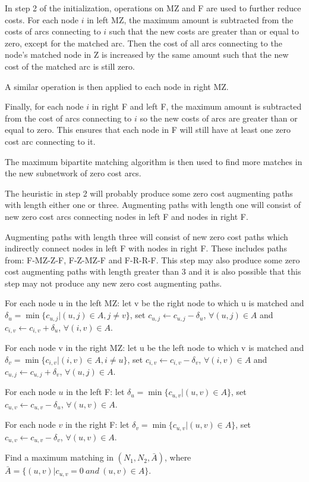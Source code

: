 In step 2 of the initialization,
operations on MZ and F are used to further reduce costs.
For each node $i$ in left MZ, the maximum amount is subtracted from
the costs of arcs connecting to $i$ such that the new costs are greater than
or equal to zero, except for the matched arc.  Then the cost of all
arcs connecting to the node's matched node in Z is increased by the
same amount such that the new cost of the matched arc is still zero.

A similar operation is then applied to each node in right MZ.

Finally, for each node $i$ in right F and left F, the maximum amount
is subtracted from the cost of arcs connecting to $i$ so the new costs
of arcs are greater than or equal to zero. This ensures that each node
in F will still have at least one zero cost arc connecting to it.

The maximum bipartite matching algorithm is then used to find more
matches in the new subnetwork of zero cost arcs.

The heuristic in step 2 will probably produce some zero cost
augmenting paths with length either one or three. Augmenting paths
with length one will consist of new zero cost arcs connecting nodes in
left F and nodes in right F.

Augmenting paths with length three will consist of new zero cost paths
which indirectly connect nodes in left F with nodes in right F.  These
includes paths from: F-MZ-Z-F, F-Z-MZ-F and F-R-R-F.  This step may
also produce some zero cost augmenting paths with length greater than
3 and it is also possible that this step may not produce any new zero
cost augmenting paths.

\vskip 5pt

\begin{enumerate}
{\small\it

\item For each node u in the left MZ: 
let v be the right node to which u is matched and 
$\delta_u =\min \{ c_{u,j}|(u,j)\in A, j\not= v\}$, 
set $c_{u,j} \leftarrow c_{u,j} - \delta_u$, $\forall (u,j)\in A$ and
$c_{i,v} \leftarrow c_{i,v} + \delta_u$, $\forall (i,v)\in A$.

\item For each node v in the right MZ: 
let u be the left node to which v is matched and 
$\delta_v =\min \{ c_{i,v}|(i,v)\in A, i\not= u\}$, 
set $c_{i,v} \leftarrow c_{i,v} - \delta_v$, $\forall (i,v)\in A$ and
$c_{u,j} \leftarrow c_{u,j} + \delta_v$, $\forall (u,j)\in A$.

\item For each node $u$ in the left F: 
let $\delta_u
=\min \{ c_{u,v}|(u,v)\in A\}$, set $c_{u,v} \leftarrow c_{u,v} - \delta_u$,
$\forall (u,v)\in A$.

\item For each node $v$ in the right F: 
let $\delta_v
=\min \{ c_{u,v}|(u,v)\in A\}$, set $c_{u,v} \leftarrow c_{u,v} - \delta_v$,
$\forall (u,v)\in A$.


\item Find a maximum matching in $(N_1,N_2,\bar A)$, where
$\bar A =\{(u,v)|c_{u,v} = 0\ and\ (u,v)\in A\}$.
}
\end{enumerate}
\vskip 5pt

